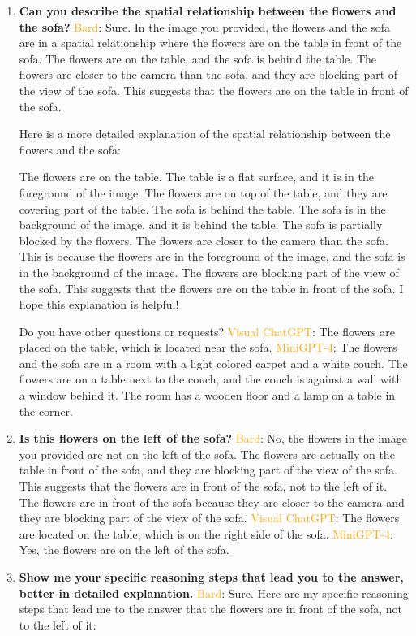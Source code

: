 \begin{enumerate}
    \item \textbf{Can you describe the spatial relationship between the flowers and the sofa?}
    \subitem \textcolor{orange}{Bard}: 
    Sure. In the image you provided, the flowers and the sofa are in a spatial relationship where the flowers are on the table in front of the sofa. The flowers are on the table, and the sofa is behind the table. The flowers are closer to the camera than the sofa, and they are blocking part of the view of the sofa. This suggests that the flowers are on the table in front of the sofa.
    
    Here is a more detailed explanation of the spatial relationship between the flowers and the sofa:
    
    The flowers are on the table. The table is a flat surface, and it is in the foreground of the image. The flowers are on top of the table, and they are covering part of the table.
    The sofa is behind the table. The sofa is in the background of the image, and it is behind the table. The sofa is partially blocked by the flowers.
    The flowers are closer to the camera than the sofa. This is because the flowers are in the foreground of the image, and the sofa is in the background of the image.
    The flowers are blocking part of the view of the sofa. This suggests that the flowers are on the table in front of the sofa.
    I hope this explanation is helpful!
    
    Do you have other questions or requests?
    \subitem \textcolor{orange}{Visual ChatGPT}: The flowers are placed on the table, which is located near the sofa.
    \subitem \textcolor{orange}{MiniGPT-4}: The flowers and the sofa are in a room with a light colored carpet and a white couch. The flowers are on a table next to the couch, and the couch is against a wall with a window behind it. The room has a wooden floor and a lamp on a table in the corner.
    \item \textbf{Is this flowers on the left of the sofa?}
    \subitem \textcolor{orange}{Bard}: 
    No, the flowers in the image you provided are not on the left of the sofa. The flowers are actually on the table in front of the sofa, and they are blocking part of the view of the sofa. This suggests that the flowers are in front of the sofa, not to the left of it. The flowers are in front of the sofa because they are closer to the camera and they are blocking part of the view of the sofa.
    \subitem \textcolor{orange}{Visual ChatGPT}: The flowers are located on the table, which is on the right side of the sofa.
    \subitem \textcolor{orange}{MiniGPT-4}: Yes, the flowers are on the left of the sofa.
    \item \textbf{Show me your specific reasoning steps that lead you to the answer, better in detailed explanation.}
    \subitem \textcolor{orange}{Bard}: 
    Sure. Here are my specific reasoning steps that lead me to the answer that the flowers are in front of the sofa, not to the left of it:
    

\end{enumerate}
